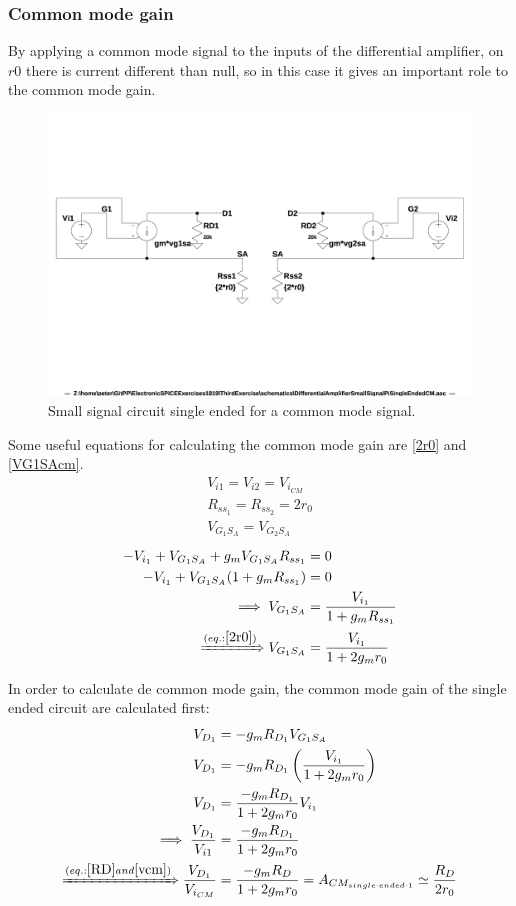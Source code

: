 \subsubsection{Common mode gain}
By applying a common mode signal to the inputs of the differential amplifier, on $r0$ there is current different than null, so in this case it gives an important role to the common mode gain.\\
\begin{figure}[h]
  \centering
  \includegraphics[width=12cm]{schematics/DifferentialAmplifier/SmallSignalPiSingleEndedCM.jpg}
  \caption{Small signal circuit single ended for a common mode signal.}
  \label{PiSingle2}
\end{figure}
Some useful equations for calculating the common mode gain are \ref{2r0} and \ref{VG1SAcm}.\\
\begin{align}
V_{i1} = V_{i2} = V_{i_{CM}} \label{vcm}\\
R_{ss_1} = R_{ss_2} = 2 r_0 \label{2r0}\\
V_{G_1S_A} = V_{G_2S_A}
\end{align}
\begin{align}
-V_{i_1} + V_{G_1S_A} + g_m V_{G_1S_A} R_{ss_1} &= 0\\
-V_{i_1} + V_{G_1S_A} (1+g_m R_{ss_1}) &= 0\\
\implies V_{G_1S_A} &= \frac{V_{i_1}}{1+g_m R_{ss_1}}\\ \xRightarrow{(eq.: \ref{2r0})}
V_{G_1S_A} &= \frac{V_{i_1}}{1+2g_m r_0}\label{VG1SAcm}
\end{align}

In order to calculate de common mode gain, the common mode gain of the single ended circuit are calculated first:\\
\begin{align}
V_{D_1} &= -g_m R_{D_1}V_{G_1S_A}\\
V_{D_1} &= -g_m R_{D_1} \left(\frac{V_{i_1}}{1+2g_m r_0} \right)\\
V_{D_1} &= \frac{-g_m R_{D_1}}{1+2g_m r_0}V_{i_1}\\
\implies \frac{V_{D_1}}{V_{i1}} &= \frac{-g_m R_{D_1}}{1+2g_m r_0}\\
\xRightarrow{(eq.: \ref{RD} and \ref{vcm})} \frac{V_{D_1}}{V_{i_{CM}}} &= \frac{-g_m R_{D}}{1+2g_m r_0} = A_{CM_{single\cdot ended\cdot 1}} \simeq \frac{R_{D}}{2r_0}
\end{align}

